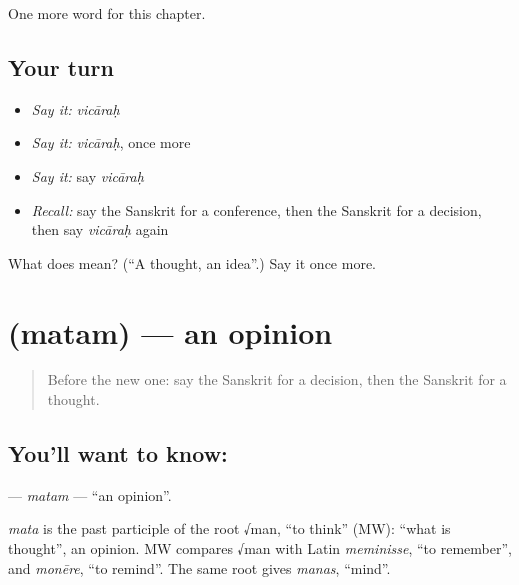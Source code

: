 \begin{grammarlens}[title={What you've built}]
One more word for this chapter.
\end{grammarlens}

\subsection*{Your turn}
\begin{itemize}
\raggedright
  \item \emph{Say it:} \emph{vicāraḥ}
  \item \emph{Say it:} \emph{vicāraḥ}, once more
  \item \emph{Say it:} say \emph{vicāraḥ}
  \item \emph{Recall:} say the Sanskrit for a conference, then the Sanskrit for a decision, then say \emph{vicāraḥ} again
\end{itemize}

\begin{tcolorbox}[breakable,colback=teal!4,colframe=teal!35!black,title={Before you move on}]
What does  mean? (\textquotedblleft{}A thought, an idea\textquotedblright{}.) Say it once more.
\end{tcolorbox}
\section[\texorpdfstring{\sk{मतम्} (matam)}{मतम् (matam)}]{ (matam) — an opinion}

\label{lesson:SA-C256-matam}



\begin{quote}
Before the new one: say the Sanskrit for a decision, then the Sanskrit for a thought.
\end{quote}

\subsection*{You'll want to know: }
\textbf{} — \emph{matam} — \textquotedblleft{}an opinion\textquotedblright{}.

\begin{cousinweb}
\emph{mata} is the past participle of the root √man, \textquotedblleft{}to think\textquotedblright{} (MW): \textquotedblleft{}what is thought\textquotedblright{}, an opinion. MW compares √man with Latin \emph{meminisse}, \textquotedblleft{}to remember\textquotedblright{}, and \emph{monēre}, \textquotedblleft{}to remind\textquotedblright{}. The same root gives \emph{manas}, \textquotedblleft{}mind\textquotedblright{}.
\end{cousinweb}

